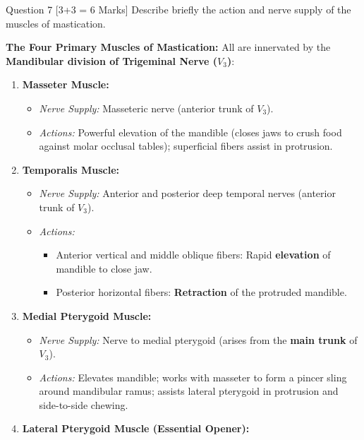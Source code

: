 \documentclass[11pt,a4paper]{article}
\begin{document}
\begin{qbox}{Question 7 [3+3 = 6 Marks]}
Describe briefly the action and nerve supply of the muscles of mastication.
\end{qbox}

\begin{ansbox}
\textbf{The Four Primary Muscles of Mastication:}
All are innervated by the \textbf{Mandibular division of Trigeminal Nerve ($V_3$)}:

\begin{enumerate}[leftmargin=*]
    \item \textbf{Masseter Muscle:}
    \begin{itemize}
        \item \textit{Nerve Supply:} Masseteric nerve (anterior trunk of $V_3$).
        \item \textit{Actions:} Powerful elevation of the mandible (closes jaws to crush food against molar occlusal tables); superficial fibers assist in protrusion.
    \end{itemize}
    \item \textbf{Temporalis Muscle:}
    \begin{itemize}
        \item \textit{Nerve Supply:} Anterior and posterior deep temporal nerves (anterior trunk of $V_3$).
        \item \textit{Actions:}
        \begin{itemize}
            \item Anterior vertical and middle oblique fibers: Rapid \textbf{elevation} of mandible to close jaw.
            \item Posterior horizontal fibers: \textbf{Retraction} of the protruded mandible.
        \end{itemize}
    \end{itemize}
    \item \textbf{Medial Pterygoid Muscle:}
    \begin{itemize}
        \item \textit{Nerve Supply:} Nerve to medial pterygoid (arises from the \textbf{main trunk} of $V_3$).
        \item \textit{Actions:} Elevates mandible; works with masseter to form a pincer sling around mandibular ramus; assists lateral pterygoid in protrusion and side-to-side chewing.
    \end{itemize}
    \item \textbf{Lateral Pterygoid Muscle (Essential Opener):}
    \begin{itemize}

\end{itemize}
\end{enumerate}
\end{ansbox}
\end{document}
